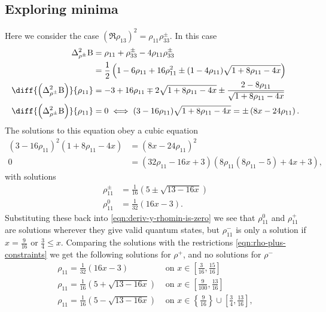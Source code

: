 \begin{subappendices}
\subsection{Exploring minima}
Here we consider the case $\left(\Re{\rho_{13}}\right)^2 = \rho_{11}\rho_{33}^\pm$. In this case
\begin{align}
  \var[\rho^\pm]{\opb} &= \rho_{11} + \rho_{33}^\pm -4\rho_{11}\rho_{33}^{\pm}\\
                       &= \frac{1}{2}\left(1 -6\rho_{11} + 16\rho_{11}^2 \pm (1-4\rho_{11})\sqrt{1+8\rho_{11}-4x}\right)\\
  \diff{\left(\var[\rho^\pm]{\opb}\right)}{\rho_{11}} &= -3 + 16\rho_{11} \mp 2\sqrt{1+8\rho_{11}-4x}\pm \frac{2-8\rho_{11}}{\sqrt{1+8\rho_{11} -4x}}\\
  \diff{\left(\var[\rho^\pm]{\opb}\right)}{\rho_{11}} &= 0 \iff (3 - 16\rho_{11})\sqrt{1+8\rho_{11} -4x} =\pm \left(8x-24\rho_{11}\right).
                                                        \label{eqn:deriv-y-rhomin-is-zero}
\end{align}
The solutions to this equation obey a cubic equation
\begin{align}
  (3 - 16\rho_{11})^2(1+8\rho_{11} -4x) &=\left(8x-24\rho_{11}\right)^2\\
  0&= (32 \rho_{11}-16 x+3) (8 \rho_{11} (8 \rho_{11}-5)+4 x+3),
\end{align}
with solutions
\begin{align}
  \rho_{11}^\pm &= \frac{1}{16} \left(5\pm\sqrt{13-16 x}\right)\\
  \rho_{11}^0 &= \frac{1}{32} \left(16 x-3 \right).
\end{align}
Substituting these back into \eqref{eqn:deriv-y-rhomin-is-zero} we see that $\rho_{11}^0$ and $\rho_{11}^+$ are solutions wherever they give valid quantum states, but $\rho_{11}^-$ is only a solution if $x=\frac{9}{16}$ or $\frac{3}{4}\leq x$. Comparing the solutions with the restrictions \eqref{eqn:rho-plus-constraints} we get the following solutions for $\rho^+$, and no solutions for $\rho^-$
\begin{subequations}
\label{eqn:rho-plus-zero-deriv-solns}
\begin{align}
  \rho_{11} = \frac{1}{32} \left(16 x-3 \right) &\text{ on } x\in\left[\frac{3}{16}, \frac{15}{16}\right]\\
  \rho_{11} = \frac{1}{16} \left(5+\sqrt{13 - 16x} \right) &\text{ on } x\in\left[\frac{9}{100},\frac{13}{16}\right]\\
  \rho_{11} = \frac{1}{16} \left(5-\sqrt{13 - 16x} \right) &\text{ on } x\in \left\{\frac{9}{16}\right\}\cup\left[\frac{3}{4},\frac{13}{16}\right],

\end{align}
\end{subequations}
\end{subappendices}
